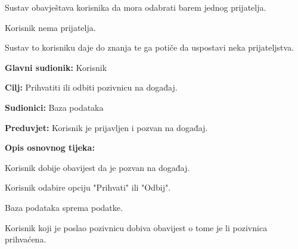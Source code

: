 \begin{packed_item}
\begin{packed_item}
\begin{packed_enum}
					\item Sustav obavještava korisnika da mora odabrati barem jednog prijatelja.
				\end{packed_enum}
			
				\item[5.b] Korisnik nema prijatelja. 
				\item[] \begin{packed_enum}
				
					\item Sustav to korisniku daje do znanja te ga potiče da uspostavi neka prijateljstva.
				\end{packed_enum}
				
				
			\end{packed_item}
		\end{packed_item}
		
		
		
		\noindent {}
		\begin{packed_item}
			
			\item \textbf{Glavni sudionik: } Korisnik
			\item  \textbf{Cilj:} Prihvatiti ili odbiti pozivnicu na događaj.
			\item  \textbf{Sudionici:} Baza podataka
			\item  \textbf{Preduvjet:} Korisnik je prijavljen i pozvan na događaj.
			\item  \textbf{Opis osnovnog tijeka:}
			
			\item[] \begin{packed_enum}
				
				\item Korisnik dobije obavijest da je pozvan na događaj.
				\item Korisnik odabire opciju "Prihvati" ili "Odbij".
				\item Baza podataka sprema podatke.
				\item Korisnik koji je poslao pozivnicu dobiva obavijest o tome je li pozivnica prihvaćena.
				
			\end{packed_enum}
		\end{packed_item}
		
